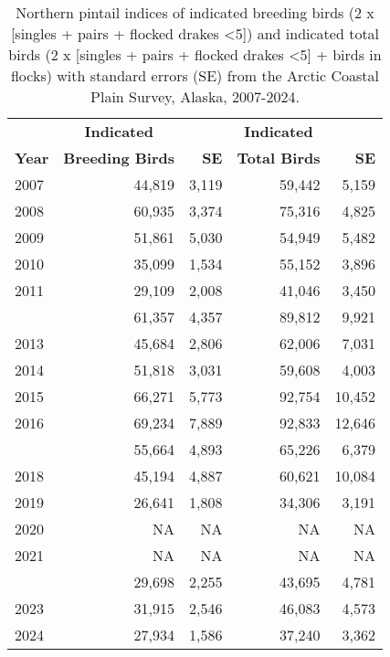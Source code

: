 \documentclass[
]{article}
\begin{document}
\begin{longtable}[t]{lrrrr}

\caption{\label{tbl-NOPI}Northern pintail indices of indicated breeding
birds (2 x {[}singles + pairs + flocked drakes \textless5{]}) and
indicated total birds (2 x {[}singles + pairs + flocked drakes
\textless5{]} + birds in flocks) with standard errors (SE) from the
Arctic Coastal Plain Survey, Alaska, 2007-2024.}

\tabularnewline

\\
\toprule
\multicolumn{1}{c}{\textbf{ }} & \multicolumn{1}{c}{\textbf{Indicated}} & \multicolumn{1}{c}{\textbf{ }} & \multicolumn{1}{c}{\textbf{Indicated}} & \multicolumn{1}{c}{\textbf{ }} \\
\cmidrule(l{3pt}r{3pt}){2-2} \cmidrule(l{3pt}r{3pt}){4-4}
\textbf{Year} & \textbf{Breeding Birds} & \textbf{SE} & \textbf{Total Birds} & \textbf{SE}\\
\midrule
2007 & 44,819 & 3,119 & 59,442 & 5,159\\
2008 & 60,935 & 3,374 & 75,316 & 4,825\\
2009 & 51,861 & 5,030 & 54,949 & 5,482\\
2010 & 35,099 & 1,534 & 55,152 & 3,896\\
2011 & 29,109 & 2,008 & 41,046 & 3,450\\
\addlinespace
2012 & 61,357 & 4,357 & 89,812 & 9,921\\
2013 & 45,684 & 2,806 & 62,006 & 7,031\\
2014 & 51,818 & 3,031 & 59,608 & 4,003\\
2015 & 66,271 & 5,773 & 92,754 & 10,452\\
2016 & 69,234 & 7,889 & 92,833 & 12,646\\
\addlinespace
2017 & 55,664 & 4,893 & 65,226 & 6,379\\
2018 & 45,194 & 4,887 & 60,621 & 10,084\\
2019 & 26,641 & 1,808 & 34,306 & 3,191\\
2020 & NA & NA & NA & NA\\
2021 & NA & NA & NA & NA\\
\addlinespace
2022 & 29,698 & 2,255 & 43,695 & 4,781\\
2023 & 31,915 & 2,546 & 46,083 & 4,573\\
2024 & 27,934 & 1,586 & 37,240 & 3,362\\
\bottomrule

\end{longtable}
\end{document}
